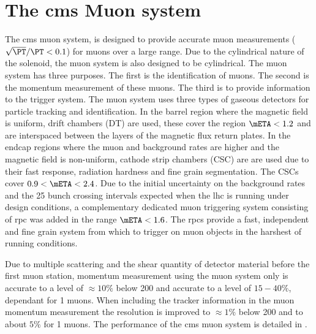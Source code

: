 \section{The \ac{cms} Muon system} %
\label{sec:the_cms_muon_system}
The \ac{cms} muon system, is designed to provide accurate muon \PT measurements
($\sqrt{\PT}/\PT < 0.1$) for muons over a large \PT range. Due to the
cylindrical nature of the solenoid, the muon system is also designed to be
cylindrical. The muon system has three purposes. The first is the identification
of muons. The second is the momentum measurement of these muons. The third is to
provide information to the trigger system.
The muon system uses three types of gaseous detectors for particle tracking and
identification. In the barrel region where the magnetic field is uniform, drift
chambers (DT) are used, these cover the region $\mETA < 1.2$ and are
interspaced between the layers of the magnetic flux return plates. In the 
endcap regions where the muon and background rates are higher and the magnetic
field is non-uniform, cathode strip chambers (CSC) are are used due to their
fast response, radiation hardness and fine grain segmentation. The CSCs cover
$0.9 < \mETA < 2.4$. Due to the initial uncertainty on the background rates and
the \unit{25}{\nano\second} bunch crossing intervals expected when the \ac{lhc}
is running under design conditions, a complementary dedicated muon triggering
system consisting of \ac{rpc} was added in the range $\mETA < 1.6$. The
\ac{rpc}s provide a fast, independent and fine grain system from
which to trigger on muon objects in the harshest of running conditions.

Due to multiple scattering and the shear quantity of detector material before
the first muon station, momentum measurement using the muon system only is
accurate to a level of $\approx10\%$ below \unit{200}{\GeV} and accurate to a
level of $15-40\%$, \mETA dependant for \unit{1}{\TeV} muons. When including
the tracker information in the muon momentum measurement the resolution is
improved to $\approx1\%$ below \unit{200}{\GeV} and to about $5\%$ for
\unit{1}{\TeV} muons. The performance of the \ac{cms} muon system is detailed
in \cite{cmsMuPerf}.


